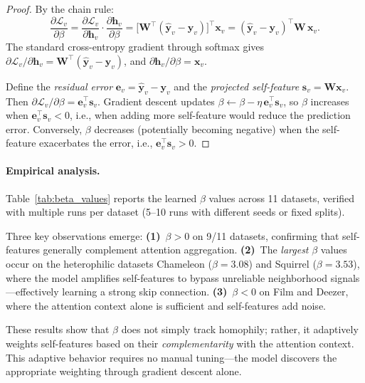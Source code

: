 \begin{proof}
By the chain rule:
\[
\frac{\partial \mathcal{L}_v}{\partial \beta}
= \frac{\partial \mathcal{L}_v}{\partial \mathbf{h}_v} \cdot \frac{\partial \mathbf{h}_v}{\partial \beta}
= \bigl[\mathbf{W}^\top(\hat{\mathbf{y}}_v - \mathbf{y}_v)\bigr]^\top \mathbf{x}_v
= (\hat{\mathbf{y}}_v - \mathbf{y}_v)^\top \mathbf{W}\,\mathbf{x}_v .
\]
The standard cross-entropy gradient through softmax gives
$\partial \mathcal{L}_v / \partial \mathbf{h}_v = \mathbf{W}^\top(\hat{\mathbf{y}}_v - \mathbf{y}_v)$,
and $\partial \mathbf{h}_v / \partial \beta = \mathbf{x}_v$.

Define the \emph{residual error} $\mathbf{e}_v = \hat{\mathbf{y}}_v - \mathbf{y}_v$
and the \emph{projected self-feature} $\mathbf{s}_v = \mathbf{W}\mathbf{x}_v$.
Then $\partial \mathcal{L}_v / \partial \beta = \mathbf{e}_v^\top \mathbf{s}_v$.
Gradient descent updates $\beta \leftarrow \beta - \eta\,\mathbf{e}_v^\top \mathbf{s}_v$,
so $\beta$ increases when $\mathbf{e}_v^\top \mathbf{s}_v < 0$, i.e., when adding
more self-feature would reduce the prediction error.
Conversely, $\beta$ decreases (potentially becoming negative) when the
self-feature exacerbates the error, i.e., $\mathbf{e}_v^\top \mathbf{s}_v > 0$.
\end{proof}


\paragraph{Empirical analysis.}
Table~\ref{tab:beta_values} reports the learned $\beta$ values across
11 datasets, verified with multiple runs per dataset
(5--10 runs with different seeds or fixed splits).

Three key observations emerge:
\textbf{(1)}~$\beta > 0$ on 9/11 datasets, confirming that self-features
generally complement attention aggregation.
\textbf{(2)}~The \emph{largest} $\beta$ values occur on the heterophilic
datasets Chameleon ($\beta{=}3.08$) and Squirrel ($\beta{=}3.53$),
where the model amplifies self-features to bypass unreliable neighborhood
signals---effectively learning a strong skip connection.
\textbf{(3)}~$\beta < 0$ on Film and Deezer, where the attention context
alone is sufficient and self-features add noise.

These results show that $\beta$ does not simply track homophily;
rather, it adaptively weights self-features based on their
\emph{complementarity} with the attention context.
This adaptive behavior requires no manual tuning---the model
discovers the appropriate weighting through gradient descent alone.


